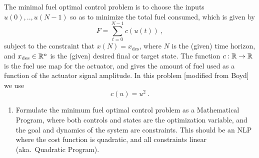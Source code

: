 The minimal fuel optimal control problem is to choose the inputs
$u(0),..,u(N-1)$ so as to minimize the total fuel consumed, which is
given by
$$
F = \sum_{t=0}^{N-1} c(u(t))~,
$$
subject to the constraint that $x(N) = x_\text{des}$, where $N$ is the
(given) time horizon, and $x_\text{des}\in{\mathbb{R}}^n$ is the (given)
desired final or target state. The function $c:{\mathbb{R}} \to {\mathbb{R}}$ is the
fuel use map for the actuator, and gives the amount of fuel used as a
function of the actuator signal amplitude. In this problem [modified from Boyd] we use
$$
c(u) = u^2 ~.
$$

\begin{enumerate}
	\item Formulate the minimum fuel optimal control problem as a Mathematical Program, where both controls and states are the optimization variable, and the goal and dynamics of the system are constraints. This should be an NLP where the cost function is quadratic, and all constraints linear (aka.\ Quadratic Program).
\end{enumerate}



\exerfoot

